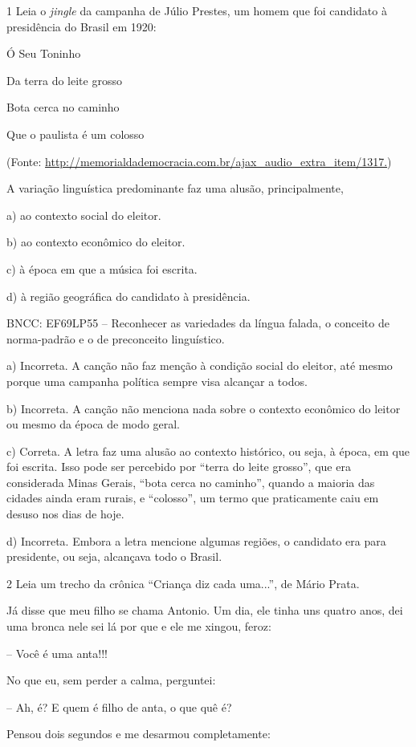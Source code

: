 
\num{1} Leia o \emph{jingle} da campanha de Júlio Prestes, um homem que
foi candidato à presidência do Brasil em 1920:

Ó Seu Toninho

Da terra do leite grosso

Bota cerca no caminho

Que o paulista é um colosso

(Fonte:
\url{http://memorialdademocracia.com.br/ajax_audio_extra_item/1317.})

A variação linguística predominante faz uma alusão, principalmente,

a) ao contexto social do eleitor.

b) ao contexto econômico do eleitor.

c) à época em que a música foi escrita.

d) à região geográfica do candidato à presidência.

BNCC: EF69LP55 -- Reconhecer as variedades da língua falada, o conceito
de norma-padrão e o de preconceito linguístico.

a) Incorreta. A canção não faz menção à condição social do eleitor, até
mesmo porque uma campanha política sempre visa alcançar a todos.

b) Incorreta. A canção não menciona nada sobre o contexto econômico do
leitor ou mesmo da época de modo geral.

c) Correta. A letra faz uma alusão ao contexto histórico, ou seja, à
época, em que foi escrita. Isso pode ser percebido por ``terra do leite
grosso'', que era considerada Minas Gerais, ``bota cerca no caminho'',
quando a maioria das cidades ainda eram rurais, e ``colosso'', um termo
que praticamente caiu em desuso nos dias de hoje.

d) Incorreta. Embora a letra mencione algumas regiões, o candidato era
para presidente, ou seja, alcançava todo o Brasil.

\num{2} Leia um trecho da crônica ``Criança diz cada uma...'', de Mário
Prata.

Já disse que meu filho se chama Antonio. Um dia, ele tinha uns quatro
anos, dei uma bronca nele sei lá por que e ele me xingou, feroz:

-- Você é uma anta!!!

No que eu, sem perder a calma, perguntei:

-- Ah, é? E quem é filho de anta, o que quê é?

Pensou dois segundos e me desarmou completamente:

